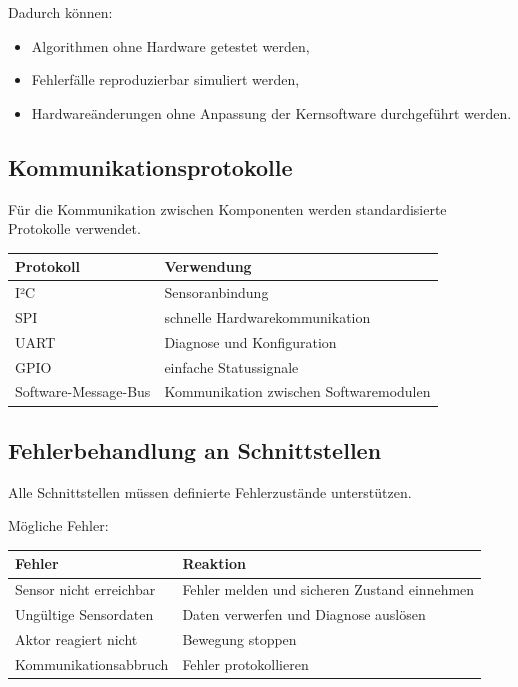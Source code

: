 Dadurch können:

\begin{itemize}
\tightlist
\item
  Algorithmen ohne Hardware getestet werden,
\item
  Fehlerfälle reproduzierbar simuliert werden,
\item
  Hardwareänderungen ohne Anpassung der Kernsoftware durchgeführt
  werden.
\end{itemize}

\subsection{Kommunikationsprotokolle}\label{kommunikationsprotokolle}

Für die Kommunikation zwischen Komponenten werden standardisierte
Protokolle verwendet.

\begin{longtable}[]{@{}ll@{}}
\toprule\noalign{}
Protokoll & Verwendung \\
\midrule\noalign{}
\endhead
\bottomrule\noalign{}
\endlastfoot
I²C & Sensoranbindung \\
SPI & schnelle Hardwarekommunikation \\
UART & Diagnose und Konfiguration \\
GPIO & einfache Statussignale \\
Software-Message-Bus & Kommunikation zwischen Softwaremodulen \\
\end{longtable}

\subsection{Fehlerbehandlung an
Schnittstellen}\label{fehlerbehandlung-an-schnittstellen}

Alle Schnittstellen müssen definierte Fehlerzustände unterstützen.

Mögliche Fehler:

\begin{longtable}[]{@{}
  >{\raggedright\arraybackslash}p{}
  >{\raggedright\arraybackslash}p{}@{}}
\toprule\noalign{}
\begin{minipage}[b]{\linewidth}\raggedright
Fehler
\end{minipage} & \begin{minipage}[b]{\linewidth}\raggedright
Reaktion
\end{minipage} \\
\midrule\noalign{}
\endhead
\bottomrule\noalign{}
\endlastfoot
Sensor nicht erreichbar & Fehler melden und sicheren Zustand
einnehmen \\
Ungültige Sensordaten & Daten verwerfen und Diagnose auslösen \\
Aktor reagiert nicht & Bewegung stoppen \\
Kommunikationsabbruch & Fehler protokollieren \\
\end{longtable}

